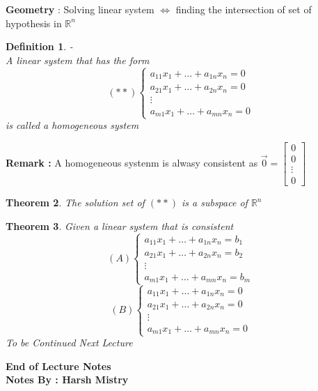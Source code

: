 \documentclass{article}
\newcounter{lecnum}
\newtheorem{theorem}{Theorem}[lecnum]
\newtheorem{definition}[theorem]{Definition}
\begin{document}
\textbf{Geometry} : Solving linear system \( \iff \) finding the intersection of set of hypothesis in \( \mathbb{R}^n\) 

\begin{definition} - \\ A linear system that has the form \\
\[ (\ast \ast) \begin{cases} a_{11} x_1 + \ldots + a_{1n} x_n = 0 \\ a_{21}x_1 + \ldots + a_{2n} x_n = 0 \\
\vdots \\ a_{m1}x_1 + \ldots + a_{mn} x_n = 0 \end{cases} \]
is called a homogeneous system
\end{definition}

\textbf{Remark : } A homogeneous systenm is alwasy consistent as \( \vec{0} = \begin{bmatrix}
0 \\ 0  \\ \vdots \\ 0
\end{bmatrix}\)

\begin{theorem} The solution set of \( (\ast \ast) \) is a subspace of \( \mathbb{R} ^n \) 
\end{theorem}
\begin{theorem} Given a linear system that is consistent \\
\[ (A) \begin{cases} a_{11} x_1 + \ldots + a_{1n} x_n = b_1 \\ a_{21}x_1 + \ldots + a_{2n} x_n = b_2 \\
\vdots \\ a_{m1}x_1 + \ldots + a_{mn} x_n = b_m \end{cases} \]
\[ (B) \begin{cases} a_{11} x_1 + \ldots + a_{1n} x_n = 0 \\ a_{21}x_1 + \ldots + a_{2n} x_n = 0 \\
\vdots \\ a_{m1}x_1 + \ldots + a_{mn} x_n = 0 \end{cases} \]
To be Continued Next Lecture
\end{theorem}

\begin{center}
\textbf{End of Lecture Notes} \\
\textbf{Notes By : Harsh Mistry}
\end{center}
\end{document}
